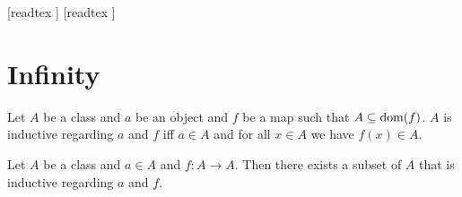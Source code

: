 \documentclass[10pt]{article}
\begin{document}
  \begin{imports}
    \begin{forthel}
      [readtex ]
      [readtex ]
    \end{forthel}
  \end{imports}


  \section{Infinity}

  \begin{forthel}
    \begin{definition}[id=FOUNDATIONS_10_298374925738210,printid]
      Let $A$ be a class and $a$ be an object and $f$ be a map such that $A \subseteq \operatorname{dom}(f)$.
      $A$ is inductive regarding $a$ and $f$ iff $a \in A$ and for all $x \in A$ we have $f(x) \in A$.
    \end{definition}
  \end{forthel}

  \begin{forthel}
    \begin{axiom}[title=Infinity Axiom,id=FOUNDATIONS_10_367388832825344,printid]
      Let $A$ be a class and $a \in A$ and $f : A \to A$.
      Then there exists a subset of $A$ that is inductive regarding $a$ and $f$.
    \end{axiom}
  \end{forthel}
\end{document}
